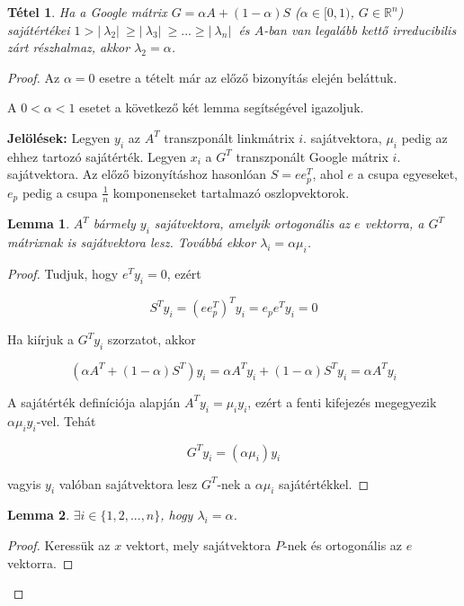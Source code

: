 \documentclass[12pt,a4paper]{article}
\newtheorem{tetel}{Tétel}
\newtheorem{lemma}{Lemma}
\begin{document}
\begin{tetel}
	Ha a Google mátrix $G = \alpha A + (1-\alpha)S$ ($\alpha \in [0,1)$, $G \in \mathbb{R}^n$) sajátértékei $ 1 > |\ \lambda_2 |\ \geq |\ \lambda_3 |\ \geq ... \geq |\ \lambda_n |\ $ és $A$-ban van legalább kettő irreducibilis zárt részhalmaz, akkor $\lambda_2 = \alpha$.
\end{tetel}
\begin{proof}
	Az $\alpha = 0$ esetre a tételt már az előző bizonyítás elején beláttuk.
	
	A $0 < \alpha < 1$ esetet a következő két lemma segítségével igazoljuk.
	
	\vspace{0.1cm}
	\textbf{Jelölések:} Legyen $y_i$ az $A^T$ transzponált linkmátrix $i.$ sajátvektora, $\mu_i$ pedig az ehhez tartozó sajátérték. Legyen $x_i$ a $G^T$ transzponált Google mátrix $i.$ sajátvektora. Az előző bizonyításhoz hasonlóan $S = e e_p^T$, ahol $e$ a csupa egyeseket, $e_p$ pedig a csupa $\frac{1}{n}$ komponenseket tartalmazó oszlopvektorok.
	
	\begin{lemma}
		$A^T$ bármely $y_i$ sajátvektora, amelyik ortogonális az $e$ vektorra, a $G^T$ mátrixnak is sajátvektora lesz. Továbbá ekkor $\lambda_i = \alpha \mu_i$.
	\end{lemma}
	\vspace{-0.5cm}
	\begin{proof}
		Tudjuk, hogy $e^T y_i = 0$, ezért
		
		\[ S^T y_i = (e e_p^T)^T y_i = e_p e^T y_i = 0 \]
		
		Ha kiírjuk a $G^T y_i$ szorzatot, akkor
		
		\[ (\alpha A^T + (1-\alpha) S^T ) y_i = \alpha A^T y_i + (1-\alpha) S^T y_i = \alpha A^T y_i \]
		
		A sajátérték definíciója alapján $A^T y_i = \mu_i y_i$, ezért a fenti kifejezés megegyezik $\alpha \mu_i y_i$-vel. Tehát
		
		\[ G^T y_i = (\alpha \mu_i) y_i \]
		
		vagyis $y_i$ valóban sajátvektora lesz $G^T$-nek a $\alpha \mu_i$ sajátértékkel.
		\phantom\qedhere
	\end{proof} 

	\begin{lemma}
		$\exists i \in \{ 1,2,...,n \}$, hogy $\lambda_i = \alpha$.
	\end{lemma}
	\vspace{-0.5cm}
	\begin{proof}
		Keressük az $x$ vektort, mely sajátvektora $P$-nek és ortogonális az $e$ vektorra.
		

\end{proof}
\end{proof}
\end{document}
